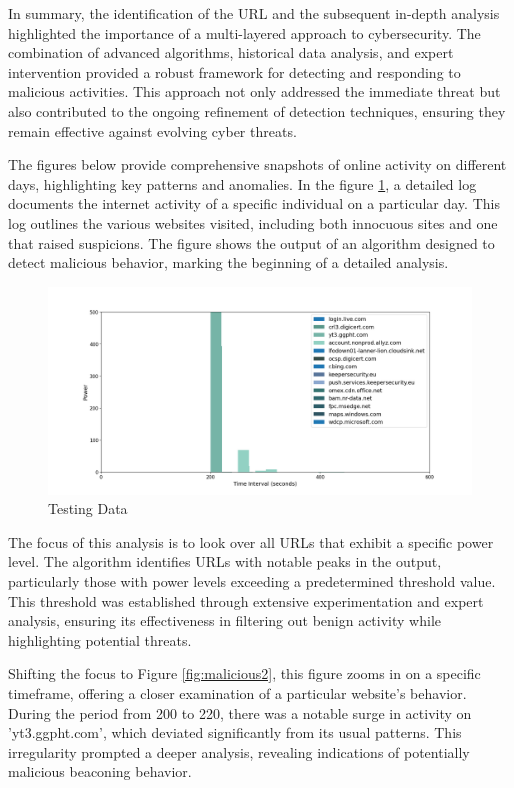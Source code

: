 In summary, the identification of the URL and the subsequent in-depth analysis highlighted the importance of a multi-layered approach to cybersecurity. The combination of advanced algorithms, historical data analysis, and expert intervention provided a robust framework for detecting and responding to malicious activities. This approach not only addressed the immediate threat but also contributed to the ongoing refinement of detection techniques, ensuring they remain effective against evolving cyber threats.

The figures below provide comprehensive snapshots of online activity on different days, highlighting key patterns and anomalies. In the figure \ref{fig:report2}, a detailed log documents the internet activity of a specific individual on a particular day. This log outlines the various websites visited, including both innocuous sites and one that raised suspicions. The figure shows the output of an algorithm designed to detect malicious behavior, marking the beginning of a detailed analysis.

\begin{figure}
    \centering
    \includegraphics[width=\textwidth]{../Thesis_Docs/media/mal2.png}
    \caption{Testing Data}
    \label{fig:report2}
\end{figure} 

The focus of this analysis is to look over all URLs that exhibit a specific power level. The algorithm identifies URLs with notable peaks in the output, particularly those with power levels exceeding a predetermined threshold value. This threshold was established through extensive experimentation and expert analysis, ensuring its effectiveness in filtering out benign activity while highlighting potential threats.

Shifting the focus to Figure \ref{fig:malicious2}, this figure zooms in on a specific timeframe, offering a closer examination of a particular website's behavior. During the period from 200 to 220, there was a notable surge in activity on 'yt3.ggpht.com', which deviated significantly from its usual patterns. This irregularity prompted a deeper analysis, revealing indications of potentially malicious beaconing behavior. 

